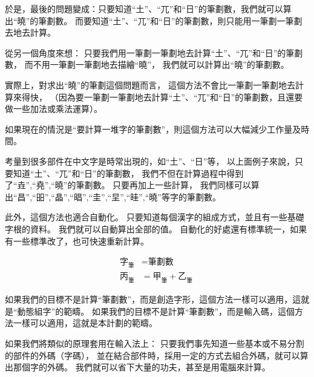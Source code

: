 \documentclass{article}
\newcommand\qhchar[1]{\mbox{#1}}
\newcommand\qhstroke[1]{\qhchar{#1}_{\mbox{筆}}}
\begin{document}
於是，最後的問題變成：只要知道``土''、``兀''和``日''的筆劃數，我們就可以算出``曉''的筆劃數。
而要知道``土''、``兀''和``日''的筆劃數，則只能用一筆劃一筆劃去地去計算。

從另一個角度來想：
只要我們用一筆劃一筆劃地去計算``土''、``兀''和``日''的筆劃數，
而不用一筆劃一筆劃地去描繪``曉''，
我們就可以計算出``曉''的筆劃數。

實際上，對求出``曉''的筆劃這個問題而言，
這個方法不會比一筆劃一筆劃地去計算來得快，
（因為要一筆劃一筆劃地去計算``土''、``兀''和``日''的筆劃數，且還要做一些加法或乘法運算）。

如果現在的情況是``要計算一堆字的筆劃數''，則這個方法可以大幅減少工作量及時間。

考量到很多部件在中文字是時常出現的，如``土''、``日''等，
以上面例子來說，只要知道``土''、``兀''和``日''的筆劃數，
我們不但在計算過程中得到了``垚'',``堯'',``曉''的筆劃數。
只要再加上一些計算，
我們同樣可以算出``昌'',``昍'',``晶'',``晿'',``圭'',``圼'',``晆'',``曉''等字的筆劃數。


此外，這個方法也適合自動化。
只要知道每個漢字的組成方式，並且有一些基礎字根的資料。
我們就可以自動算出全部的值。
自動化的好處還有標準統一，如果有一些標準改了，也可快速重新計算。

\begin{subequations}
  \begin{align}
  \qhstroke{字} &= \text{筆劃數}\\
  \qhstroke{丙} &= \qhstroke{甲} + \qhstroke{乙}\
  \end{align}
\end{subequations}

如果我們的目標不是計算``筆劃數''，而是創造字形，這個方法一樣可以適用，這就是``動態組字''的範疇。
如果我們的目標不是計算``筆劃數''，而是輸入碼，這個方法一樣可以適用，這就是本計劃的範疇。

如果我們將類似的原理套用在輸入法上：
只要我們事先知道一些基本或不易分割的部件的外碼（字碼），
並在結合部件時，採用一定的方式去組合外碼，就可以算出那個字的外碼。
我們就可以省下大量的功夫，甚至是用電腦來計算。
\end{document}

